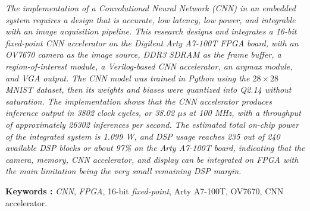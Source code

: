 \textit{
	The implementation of a \emph{Convolutional Neural Network} (CNN) in an embedded system requires a design that is accurate, low latency, low power, and integrable with an image acquisition pipeline. This research designs and integrates a 16-bit fixed-point CNN accelerator on the Digilent Arty A7-100T FPGA board, with an OV7670 camera as the image source, DDR3 SDRAM as the frame buffer, a region-of-interest module, a Verilog-based CNN accelerator, an argmax module, and VGA output. The CNN model was trained in Python using the $28 \times 28$ MNIST dataset, then its weights and biases were quantized into Q2.14 without saturation. The implementation shows that the CNN accelerator produces inference output in 3802 clock cycles, or 38.02 $\mu$s at 100 MHz, with a throughput of approximately 26302 inferences per second. The estimated total on-chip power of the integrated system is 1.099 W, and DSP usage reaches 235 out of 240 available DSP blocks or about 97\% on the Arty A7-100T board, indicating that the camera, memory, CNN accelerator, and display can be integrated on FPGA with the main limitation being the very small remaining DSP margin.
}

\bigskip
\noindent
\textbf{Keywords :} \emph{CNN}, \emph{FPGA}, 16-bit \emph{fixed-point}, Arty A7-100T, OV7670, CNN accelerator.